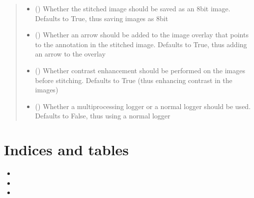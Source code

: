 \documentclass[letterpaper,10pt,english]{sphinxmanual}
\begin{document}
\begin{fulllineitems}
\begin{fulllineitems}
\begin{quote}
\begin{description}
\begin{itemize}
\item {} 
 () \textendash{} Whether the stitched image should be saved as an 8bit image. Defaults to True, thus saving
images as 8bit

\item {} 
 () \textendash{} Whether an arrow should be added to the image overlay that points to the annotation in
the stitched image. Defaults to True, thus adding an arrow to the overlay

\item {} 
 () \textendash{} Whether contrast enhancement should be performed on the images before stitching.
Defaults to True (thus enhancing contrast in the images)

\item {} 
 () \textendash{} Whether a multiprocessing logger or a normal logger should be used. Defaults
to False, thus using a normal logger

\end{itemize}

\end{description}\end{quote}

\end{fulllineitems}


\end{fulllineitems}



\chapter{Indices and tables}
\label{\detokenize{index:indices-and-tables}}\begin{itemize}
\item {} 

\item {} 

\item {} 

\end{itemize}
\end{document}
